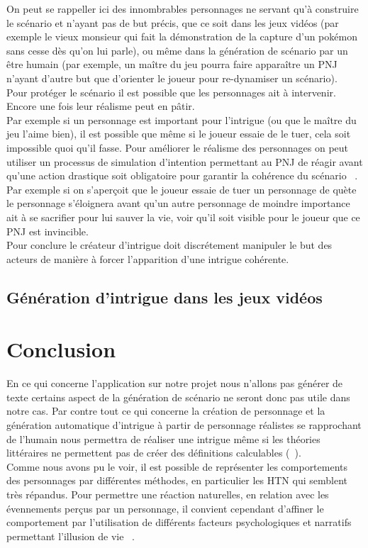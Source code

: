 \documentclass[asi]{picINSA}
\begin{document}
On peut se rappeller ici des innombrables personnages ne servant qu'à construire le scénario et n'ayant pas de but précis, que ce soit dans les jeux vidéos (par exemple le vieux monsieur qui fait la démonstration de la capture d'un pokémon sans cesse dès qu'on lui parle), ou même dans la génération de scénario par un être humain (par exemple, un maître du jeu pourra faire apparaître un PNJ n'ayant d'autre but que d'orienter le joueur pour re-dynamiser un scénario). \\

Pour protéger le scénario il est possible que les personnages ait à intervenir. Encore une fois leur réalisme peut en pâtir. \\

Par exemple si un personnage est important pour l'intrigue (ou que le maître du jeu l'aime bien), il est possible que même si le joueur essaie de le tuer, cela soit impossible quoi qu'il fasse. Pour améliorer le réalisme des personnages on peut utiliser un processus de simulation d'intention permettant au PNJ de réagir avant qu'une action drastique soit obligatoire pour garantir la cohérence du scénario ~\cite{Ciarlini:2010:ERP:1658866.1658874}. Par exemple si on s'aperçoit que le joueur essaie de tuer un personnage de quète le personnage s'éloignera avant qu'un autre personnage de moindre importance ait à se sacrifier pour lui sauver la vie, voir qu'il soit visible pour le joueur que ce PNJ est invincible. \\

Pour conclure le créateur d'intrigue doit discrétement manipuler le but des acteurs de manière à forcer l'apparition d'une intrigue cohérente.

\section{Génération d'intrigue dans les jeux vidéos}



\chapter*{Conclusion}

En ce qui concerne l'application sur notre projet nous n'allons pas générer de texte certains aspect de la génération de scénario ne seront donc pas utile dans notre cas. Par contre tout ce qui concerne la création de personnage et la génération automatique d'intrigue à partir de personnage réalistes se rapprochant de l'humain nous permettra de réaliser une intrigue même si les théories littéraires ne permettent pas de créer des définitions calculables (~\cite{Callaway2002213}). \\

Comme nous avons pu le voir, il est possible de représenter les comportements des personnages par différentes méthodes, en particulier les HTN qui semblent très répandus. Pour permettre une réaction naturelles, en relation avec les évennements perçus par un personnage, il convient cependant d'affiner le comportement par l'utilisation de différents facteurs psychologiques et narratifs permettant l'illusion de vie ~\cite{Bates94therole}.

{}

\end{document}
